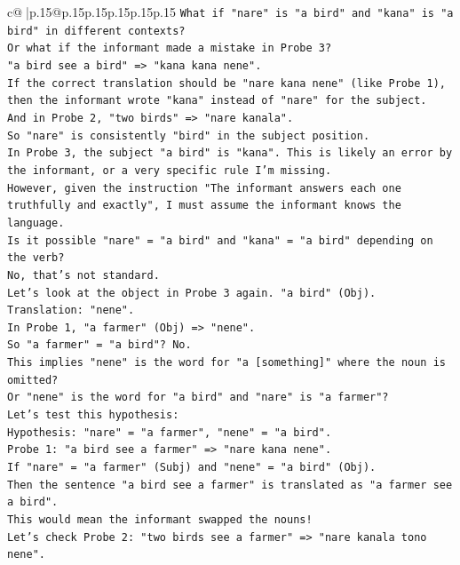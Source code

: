 \documentclass{article}
\begin{document}
{\begin{supertabular}{c@{$\;$}|p{.15\linewidth}@{}p{.15\linewidth}p{.15\linewidth}p{.15\linewidth}p{.15\linewidth}p{.15\linewidth}}
{{{\texttt{What if "nare" is "a bird" and "kana" is "a bird" in different contexts?} \\
\texttt{Or what if the informant made a mistake in Probe 3?} \\
\texttt{"a bird see a bird" => "kana kana nene".} \\
\texttt{If the correct translation should be "nare kana nene" (like Probe 1), then the informant wrote "kana" instead of "nare" for the subject.} \\
\texttt{And in Probe 2, "two birds" => "nare kanala".} \\
\texttt{So "nare" is consistently "bird" in the subject position.} \\
\texttt{In Probe 3, the subject "a bird" is "kana". This is likely an error by the informant, or a very specific rule I'm missing.} \\
\texttt{However, given the instruction "The informant answers each one truthfully and exactly", I must assume the informant knows the language.} \\
\texttt{Is it possible "nare" = "a bird" and "kana" = "a bird" depending on the verb?} \\
\texttt{No, that's not standard.} \\
\texttt{Let's look at the object in Probe 3 again. "a bird" (Obj).} \\
\texttt{Translation: "nene".} \\
\texttt{In Probe 1, "a farmer" (Obj) => "nene".} \\
\texttt{So "a farmer" = "a bird"? No.} \\
\texttt{This implies "nene" is the word for "a {[}something{]}" where the noun is omitted?} \\
\texttt{Or "nene" is the word for "a bird" and "nare" is "a farmer"?} \\
\texttt{Let's test this hypothesis:} \\
\texttt{Hypothesis: "nare" = "a farmer", "nene" = "a bird".} \\
\texttt{Probe 1: "a bird see a farmer" => "nare kana nene".} \\
\texttt{If "nare" = "a farmer" (Subj) and "nene" = "a bird" (Obj).} \\
\texttt{Then the sentence "a bird see a farmer" is translated as "a farmer see a bird".} \\
\texttt{This would mean the informant swapped the nouns!} \\
\texttt{Let's check Probe 2: "two birds see a farmer" => "nare kanala tono nene".} \\
}}}
\end{supertabular}}
\end{document}
